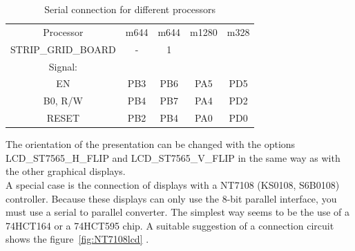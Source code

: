 \begin{table}[H]
  \begin{center}
    \begin{tabular}{| c || c | c | c | c |}
    \hline
 Processor  & m644  & m644 & m1280  & m328 \\
STRIP\_GRID\_BOARD &   -   &   1   &        &     \\
    \hline
    \hline
Signal:     &       &       &        &         \\
  EN        &  PB3  & PB6   &  PA5   & PD5     \\
    \hline
  B0, R/W   &  PB4  & PB7   &  PA4   & PD2      \\
    \hline
  RESET     &  PB2  & PB4   &  PA0   & PD0      \\
    \hline
    \end{tabular}
  \end{center}
  \caption{Serial connection for different processors}
  \label{tab:ser-processor}
\end{table}

The orientation of the presentation can be changed with the options LCD\_ST7565\_H\_FLIP and 
LCD\_ST7565\_V\_FLIP in the same way as with the other graphical displays.\\

A special case is the connection of displays with a NT7108 (KS0108, S6B0108) controller. Because these displays can only use 
the 8-bit parallel interface, you must use a serial to parallel converter.
The simplest way seems to be the use of a 74HCT164 or a 74HCT595 chip.
A suitable suggestion of a connection circuit shows the figure~\ref{fig:NT7108lcd} .

